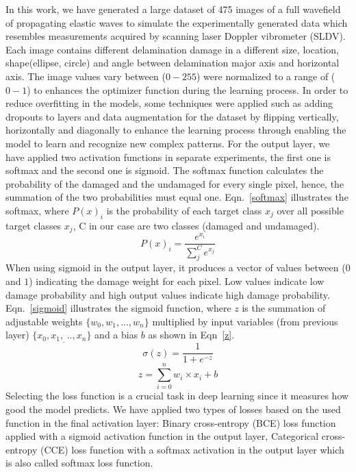 \documentclass[preprint,9pt]{elsarticle}
\begin{document}
In this work, we have generated a large dataset of 475 images of a full wavefield of propagating elastic waves to simulate the experimentally generated data which resembles measurements acquired by scanning laser Doppler vibrometer (SLDV).
Each image contains different delamination damage in a different size, location, shape(ellipse, circle) and angle between delamination major axis and horizontal axis.
The image values vary between (\(0 - 255\)) were normalized to a range of (\(0-1\)) to enhances the optimizer function during the learning process. 
In order to reduce overfitting in the models, some techniques were applied such as adding dropouts to layers and data augmentation for the dataset by flipping vertically, horizontally and diagonally to enhance the learning process through enabling the model to learn and recognize new complex patterns.
For the output layer, we have applied two activation functions in separate experiments, the first one is softmax and the second one is sigmoid. 
The softmax function calculates the probability of the damaged and the undamaged for every single pixel, hence, the summation of the two probabilities must equal one. Eqn.~\ref{softmax} illustrates the softmax, where \(P(x)_{i}\) is the probability of each target class \(x_{j}\) over all possible target classes \(x_{j}\), C in our case are two classes  (damaged and undamaged).
\begin{equation}
P(x)_{i} = \frac{e^{x_{i}}}{\sum_{j}^{C} e^{x_{j}}}
\label{softmax}
\end{equation} 
When using sigmoid in the output layer, it produces a vector of values between (\(0\) and \(1\)) indicating the damage weight for each pixel. 
Low values indicate low damage probability and high output values indicate high damage probability. Eqn.~\ref{sigmoid} illustrates the sigmoid function, 
where \(z\) is the summation of adjustable weights \(\{w_0,w_1,...,w_n \}\) multiplied by input variables (from previous layer) \(\{x_0,x_1,_...,x_n\}\) and a bias \(b\) as shown in Eqn~\ref{z}.
\begin{equation}
	\sigma(z) = \frac{1}{1+e^{-z}}
	\label{sigmoid}
\end{equation}
\begin{equation}
	z= \sum_{i=0}^{n}  w_i\times x_i +b
	\label{z}
\end{equation}
Selecting the loss function is a crucial task in deep learning since it measures how good the model predicts.
We have applied two types of losses based on the used function in the final activation layer: Binary cross-entropy (BCE) loss function applied with a sigmoid activation function in the output layer, Categorical cross-entropy (CCE) loss function with a softmax activation in the output layer which is also called softmax loss function.
\end{document}
